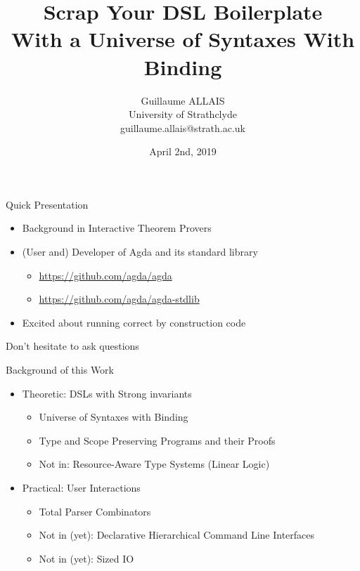 \documentclass{beamer}
\begin{document}
\author{Guillaume ALLAIS
       \\ University of Strathclyde
       \\ guillaume.allais@strath.ac.uk}
\title{Scrap Your DSL Boilerplate\\
With a Universe of Syntaxes With Binding}
\date{April 2nd, 2019}

\begin{frame}
\maketitle
\end{frame}

\begin{frame}{Quick Presentation}
\begin{itemize}
  \item Background in Interactive Theorem Provers
  \item (User and) Developer of Agda and its standard library
    \begin{itemize}
      \item \url{https://github.com/agda/agda}
      \item \url{https://github.com/agda/agda-stdlib}
    \end{itemize}
  \item Excited about running correct by construction code
\end{itemize}
\end{frame}

\begin{frame}{Don't hesitate to ask questions}
\end{frame}

\begin{frame}{Background of this Work}

\begin{itemize}
  \item Theoretic: DSLs with Strong invariants
    {
    \begin{itemize}
      \item Universe of Syntaxes with Binding
      \item Type and Scope Preserving Programs and their Proofs
      \item Not in: Resource-Aware Type Systems (Linear Logic)
    \end{itemize}
    }
  \medskip
  \item Practical: User Interactions
    {
    \begin{itemize}
      \item Total Parser Combinators
      \item Not in (yet): Declarative Hierarchical Command Line Interfaces
      \item Not in (yet): Sized IO
    \end{itemize}
    }
\end{itemize}
\end{frame}
\end{document}

